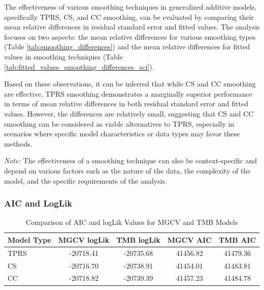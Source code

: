 \documentclass[12pt, twoside,hidelinks]{article}
\theoremstyle{definition}
\numberwithin{equation}{section}
\begin{document}
The effectiveness of various smoothing techniques in generalized additive models, specifically TPRS, CS, and CC smoothing, can be evaluated by comparing their mean relative differences in residual standard error and fitted values. The analysis focuses on two aspects: the mean relative differences for various smoothing types (Table \ref{tab:smoothing_differences}) and the mean relative differences for fitted values in smoothing techniques (Table \ref{tab:fitted_values_smoothing_differences_sci}).



Based on these observations, it can be inferred that while CS and CC smoothing are effective, TPRS smoothing demonstrates a marginally superior performance in terms of mean relative differences in both residual standard error and fitted values. However, the differences are relatively small, suggesting that CS and CC smoothing can be considered as viable alternatives to TPRS, especially in scenarios where specific model characteristics or data types may favor these methods.

\textit{Note:} The effectiveness of a smoothing technique can also be context-specific and depend on various factors such as the nature of the data, the complexity of the model, and the specific requirements of the analysis.


\subsubsection*{AIC and LogLik}

\begin{table}[h]
\centering
\begin{tabular}{|l|c|c|c|c|}
\hline
\textbf{Model Type} & \textbf{MGCV logLik} & \textbf{TMB logLik} & \textbf{MGCV AIC} & \textbf{TMB AIC} \\ \hline
TPRS               & -20718.41            & -20735.68           & 41456.82          & 41479.36         \\ \hline
CS                 & -20716.70            & -20738.91           & 41454.01          & 41483.81         \\ \hline
CC                 & -20718.82            & -20739.39           & 41457.23          & 41484.78         \\ \hline
\end{tabular}
\caption{Comparison of AIC and logLik Values for MGCV and TMB Models}
\label{tab:mgcv_tmb_comparison}
\end{table}
\end{document}
